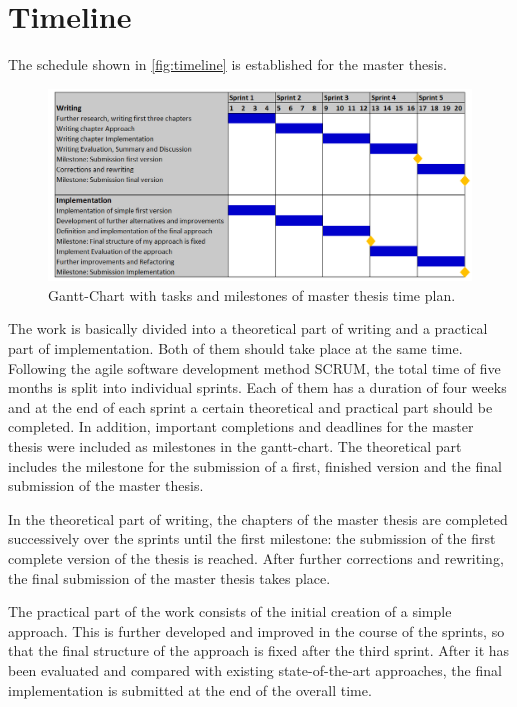 \chapter{Timeline}
\label{ch:timeline}

The schedule shown in \autoref{fig:timeline} is established for the master thesis.
\begin{figure}
  \centering
    \includegraphics[width=\textwidth]{figures/gantt_chart.png}
  \caption{Gantt-Chart with tasks and milestones of master thesis time plan.}
  \label{fig:timeline}
\end{figure}
The work is basically divided into a theoretical part of writing and a practical part of implementation.
Both of them should take place at the same time.
Following the agile software development method SCRUM, the total time of five months is split into individual sprints.
Each of them has a duration of four weeks and at the end of each sprint a certain theoretical and practical part should be completed.
In addition, important completions and deadlines for the master thesis were included as milestones in the gantt-chart.
The theoretical part includes the milestone for the submission of a first, finished version and the final submission of the master thesis.

In the theoretical part of writing, the chapters of the master thesis are completed successively over the sprints until the first milestone: the submission of the first complete version of the thesis is reached.
After further corrections and rewriting, the final submission of the master thesis takes place.

The practical part of the work consists of the initial creation of a simple approach.
This is further developed and improved in the course of the sprints, so that the final structure of the approach is fixed after the third sprint.
After it has been evaluated and compared with existing state-of-the-art approaches, the final implementation is submitted at the end of the overall time.

